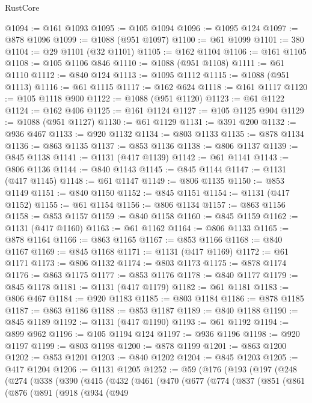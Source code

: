 \begin{lexlean}{RustCore}
\begin{coremodule}
@1094 := @161 @1093
@1095 := @105 @1094
@1096 := @1095 @124
@1097 := @878 @1096
@1099 := @1088 (@951 @1097)
@1100 := @61 @1099
@1101 := 380
@1104 := @29 @1101 (@32 @1101)
@1105 := @162 @1104
@1106 := @161 @1105
@1108 := @105 @1106 @846
@1110 := @1088 (@951 @1108)
@1111 := @61 @1110
@1112 := @840 @124
@1113 := @1095 @1112
@1115 := @1088 (@951 @1113)
@1116 := @61 @1115
@1117 := @162 @624
@1118 := @161 @1117
@1120 := @105 @1118 @900
@1122 := @1088 (@951 @1120)
@1123 := @61 @1122
@1124 := @162 @406
@1125 := @161 @1124
@1127 := @105 @1125 @904
@1129 := @1088 (@951 @1127)
@1130 := @61 @1129
@1131 := @391 @200
@1132 := @936 @467
@1133 := @920 @1132
@1134 := @803 @1133
@1135 := @878 @1134
@1136 := @863 @1135
@1137 := @853 @1136
@1138 := @806 @1137
@1139 := @845 @1138
@1141 := @1131 (@417 @1139)
@1142 := @61 @1141
@1143 := @806 @1136
@1144 := @840 @1143
@1145 := @845 @1144
@1147 := @1131 (@417 @1145)
@1148 := @61 @1147
@1149 := @806 @1135
@1150 := @853 @1149
@1151 := @840 @1150
@1152 := @845 @1151
@1154 := @1131 (@417 @1152)
@1155 := @61 @1154
@1156 := @806 @1134
@1157 := @863 @1156
@1158 := @853 @1157
@1159 := @840 @1158
@1160 := @845 @1159
@1162 := @1131 (@417 @1160)
@1163 := @61 @1162
@1164 := @806 @1133
@1165 := @878 @1164
@1166 := @863 @1165
@1167 := @853 @1166
@1168 := @840 @1167
@1169 := @845 @1168
@1171 := @1131 (@417 @1169)
@1172 := @61 @1171
@1173 := @806 @1132
@1174 := @803 @1173
@1175 := @878 @1174
@1176 := @863 @1175
@1177 := @853 @1176
@1178 := @840 @1177
@1179 := @845 @1178
@1181 := @1131 (@417 @1179)
@1182 := @61 @1181
@1183 := @806 @467
@1184 := @920 @1183
@1185 := @803 @1184
@1186 := @878 @1185
@1187 := @863 @1186
@1188 := @853 @1187
@1189 := @840 @1188
@1190 := @845 @1189
@1192 := @1131 (@417 @1190)
@1193 := @61 @1192
@1194 := @899 @962
@1196 := @105 @1194 @124
@1197 := @936 @1196
@1198 := @920 @1197
@1199 := @803 @1198
@1200 := @878 @1199
@1201 := @863 @1200
@1202 := @853 @1201
@1203 := @840 @1202
@1204 := @845 @1203
@1205 := @417 @1204
@1206 := @1131 @1205
@1252 := @59
    (@176
      (@193
        (@197
          (@248
            (@274
              (@338
                (@390
                  (@415
                    (@432
                      (@461
                        (@470
                          (@677
                            (@774
                              (@837
                                (@851
                                  (@861
                                    (@876
                                      (@891
                                        (@918
                                          (@934
                                            (@949

\end{coremodule}
\end{lexlean}
